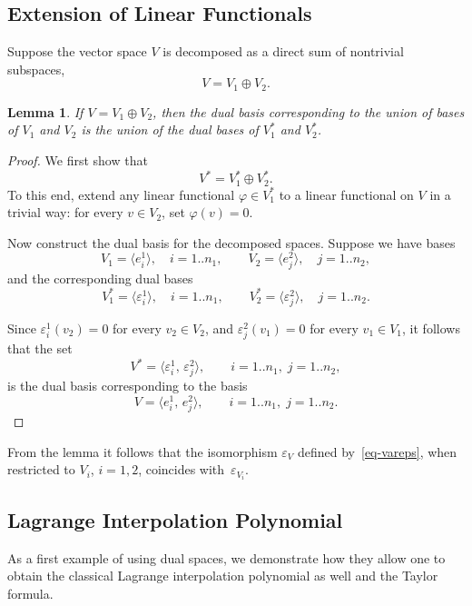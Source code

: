 \documentclass{article}
\newtheorem{lemma}[theorem]{Lemma}  	%
\theoremstyle{definition}
\theoremstyle{definition}
\numberwithin{figure}{section}
\newcommand{\1}{\mathbf{1}}
\begin{document}
\subsection{Extension of Linear Functionals}

Suppose the vector space $V$ is decomposed as a direct sum of nontrivial subspaces,
\[
    V = V_1 \oplus V_2.
\]

\begin{lemma}\label{lemma-V+V**}
If $V = V_1 \oplus V_2$, then the dual basis corresponding to the union of bases of $V_1$ and $V_2$ is the union of the dual bases of $V_1^*$ and $V_2^*$.
\end{lemma}

\begin{proof}
We first show that
\[
    V^* = V_1^* \oplus V_2^*.
\]
To this end, extend any linear functional $\varphi \in V_1^*$ to a linear functional on $V$ in a trivial way: for every $v \in V_2$, set $\varphi(v) = 0$.

Now construct the dual basis for the decomposed spaces. Suppose we have bases
\[
    V_1 = \langle e^1_i \rangle,\quad i = 1..n_1,
    \qquad
    V_2 = \langle e^2_j \rangle,\quad j = 1..n_2,
\]
and the corresponding dual bases
\[
    V_1^* = \langle \varepsilon^1_i \rangle,\quad i = 1..n_1,
    \qquad
    V_2^* = \langle \varepsilon^2_j \rangle,\quad j = 1..n_2.
\]

Since $\varepsilon^1_i(v_2) = 0$ for every $v_2 \in V_2$, and $\varepsilon^2_j(v_1) = 0$ for every $v_1 \in V_1$, it follows that the set
\[
    V^* = \langle \varepsilon^1_i,\, \varepsilon^2_j \rangle,
    \qquad i = 1..n_1,\; j = 1..n_2,
\]
is the dual basis corresponding to the basis
\[
    V = \langle e^1_i,\, e^2_j \rangle,
    \qquad i = 1..n_1,\; j = 1..n_2.
\]
\end{proof}

From the lemma it follows that the isomorphism $\varepsilon_V$ defined by~\eqref{eq-vareps}, when restricted to $V_i$, $i=1,2$, coincides with~$\varepsilon_{V_i}$.

\subsection{Lagrange Interpolation Polynomial}

As a first example of using dual spaces, we demonstrate how they allow one to obtain the classical Lagrange interpolation polynomial as well and the Taylor formula.

\smallskip
\end{document}
